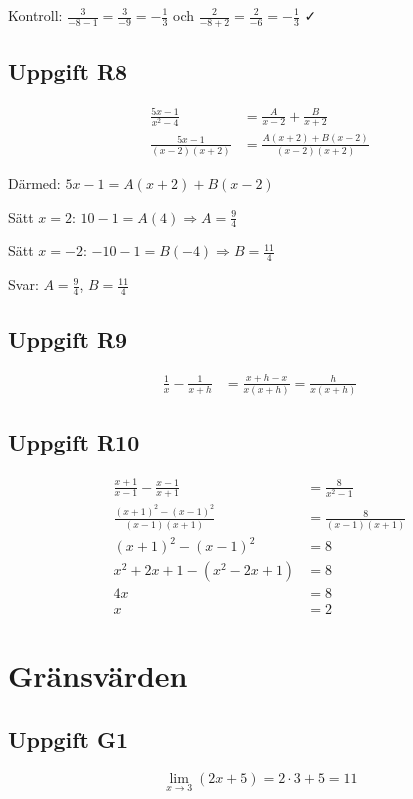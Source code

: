 \documentclass[12pt]{article}
\begin{document}
Kontroll: $\frac{3}{-8 - 1} = \frac{3}{-9} = -\frac{1}{3}$ och $\frac{2}{-8 + 2} = \frac{2}{-6} = -\frac{1}{3}$ ✓

\subsection*{Uppgift R8}
\begin{align*}
\frac{5x - 1}{x^2 - 4} &= \frac{A}{x - 2} + \frac{B}{x + 2} \\
\frac{5x - 1}{(x - 2)(x + 2)} &= \frac{A(x + 2) + B(x - 2)}{(x - 2)(x + 2)}
\end{align*}

Därmed: $5x - 1 = A(x + 2) + B(x - 2)$

Sätt $x = 2$: $10 - 1 = A(4) \Rightarrow A = \frac{9}{4}$

Sätt $x = -2$: $-10 - 1 = B(-4) \Rightarrow B = \frac{11}{4}$

Svar: $A = \frac{9}{4}$, $B = \frac{11}{4}$

\subsection*{Uppgift R9}
\begin{align*}
\frac{1}{x} - \frac{1}{x + h} &= \frac{x + h - x}{x(x + h)} = \frac{h}{x(x + h)}
\end{align*}

\subsection*{Uppgift R10}
\begin{align*}
\frac{x + 1}{x - 1} - \frac{x - 1}{x + 1} &= \frac{8}{x^2 - 1} \\
\frac{(x + 1)^2 - (x - 1)^2}{(x - 1)(x + 1)} &= \frac{8}{(x - 1)(x + 1)} \\
(x + 1)^2 - (x - 1)^2 &= 8 \\
x^2 + 2x + 1 - (x^2 - 2x + 1) &= 8 \\
4x &= 8 \\
x &= 2
\end{align*}

\newpage

\section{Gränsvärden}

\subsection*{Uppgift G1}
\[
\lim_{x \to 3} (2x + 5) = 2 \cdot 3 + 5 = 11
\]
\end{document}
